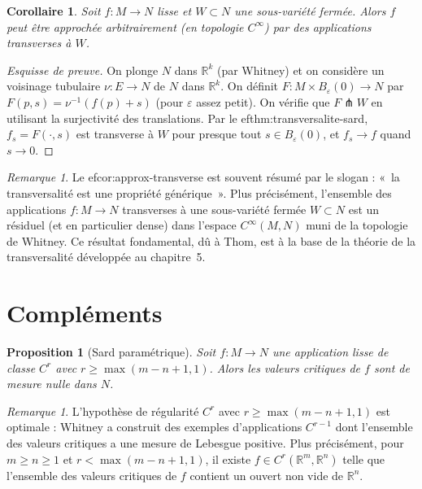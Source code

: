 \documentclass[12pt,a4paper,openany]{book}
\theoremstyle{definition}
\theoremstyle{plain}
\newtheorem{proposition}[definition]{Proposition}
\newtheorem{corollaire}[definition]{Corollaire}
\theoremstyle{remark}
\newtheorem{remarque}[definition]{Remarque}
\newcommand{\R}{\mathbb{R}}
\begin{document}
\begin{corollaire}\label{cor:approx-transverse}
Soit $f \colon M \to N$ lisse et $W \subset N$ une sous-variété fermée.
Alors $f$ peut être approchée arbitrairement (en topologie $C^\infty$) par
des applications transverses à $W$.
\end{corollaire}

\begin{proof}[Esquisse de preuve]
On plonge $N$ dans $\R^k$ (par Whitney) et on considère un voisinage tubulaire
$\nu \colon E \to N$ de $N$ dans $\R^k$. On définit
$F \colon M \times B_\varepsilon(0) \to N$ par $F(p,s) = \nu^{-1}(f(p) + s)$
(pour $\varepsilon$ assez petit). On vérifie que $F \pitchfork W$ en utilisant
la surjectivité des translations. Par le 
ef{thm:transversalite-sard},
$f_s = F(\cdot, s)$ est transverse à $W$ pour presque tout $s \in B_\varepsilon(0)$,
et $f_s \to f$ quand $s \to 0$.
\end{proof}

\begin{remarque}\label{rem:transversalite-generique}
Le 
ef{cor:approx-transverse} est souvent résumé par le slogan :
«~la transversalité est une propriété générique~». Plus précisément,
l'ensemble des applications $f \colon M \to N$ transverses à une sous-variété
fermée $W \subset N$ est un résiduel (et en particulier dense) dans l'espace
$C^\infty(M, N)$ muni de la topologie de Whitney. Ce résultat fondamental,
dû à Thom, est à la base de la théorie de la transversalité développée au
chapitre~5.
\end{remarque}

\section{Compléments}\label{sec:sard-complements}

\begin{proposition}[Sard paramétrique]\label{prop:sard-parametrique}
Soit $f \colon M \to N$ une application lisse de classe $C^r$ avec
$r \geq \max(m - n + 1, 1)$. Alors les valeurs critiques de $f$ sont de
mesure nulle dans $N$.
\end{proposition}

\begin{remarque}\label{rem:sard-Cr}
L'hypothèse de régularité $C^r$ avec $r \geq \max(m-n+1, 1)$ est optimale :
Whitney a construit des exemples d'applications $C^{r-1}$ dont l'ensemble des
valeurs critiques a une mesure de Lebesgue positive. Plus précisément, pour
$m \geq n \geq 1$ et $r < \max(m - n + 1, 1)$, il existe $f \in C^r(\R^m, \R^n)$
telle que l'ensemble des valeurs critiques de $f$ contient un ouvert non vide
de $\R^n$.
\end{remarque}
\end{document}
